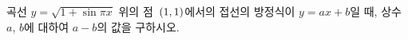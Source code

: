 곡선 $y=\sqrt{1+\sin\pi x}$ 위의 점~$(1{,}\mkern3mu\mathopen{}1)$에서의 접선의 방정식이 $y=ax+b$일 때, 상수 $a$, $b$에 대하여 $a-b$의 값을 구하시오.
